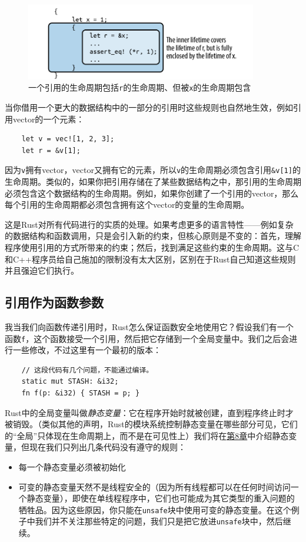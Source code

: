 \begin{figure}[htbp]
    \centering
    \includegraphics[width=0.9\textwidth]{../img/f5-6.png}
    \caption{一个引用的生命周期包括\texttt{r}的生命周期、但被\texttt{x}的生命周期包含}
    \label{f5-6}
\end{figure}

当你借用一个更大的数据结构中的一部分的引用时这些规则也自然地生效，例如引用vector的一个元素：
\begin{verbatim}
    let v = vec![1, 2, 3];
    let r = &v[1];
\end{verbatim}

因为\texttt{v}拥有vector，vector又拥有它的元素，所以\texttt{v}的生命周期必须包含引用\texttt{\&v[1]}的生命周期。类似的，如果你把引用存储在了某些数据结构之中，那引用的生命周期必须包含这个数据结构的生命周期。例如，如果你创建了一个引用的vector，那么每个引用的生命周期都必须包含拥有这个vector的变量的生命周期。

这是Rust对所有代码进行的实质的处理。如果考虑更多的语言特性——例如复杂的数据结构和函数调用，只是会引入新的约束，但核心原则是不变的：首先，理解程序使用引用的方式所带来的约束；然后，找到满足这些约束的生命周期。这与C和C++程序员给自己施加的限制没有太大区别，区别在于Rust自己知道这些规则并且强迫它们执行。

\subsection{引用作为函数参数}\label{RefAsArg}

我当我们向函数传递引用时，Rust怎么保证函数安全地使用它？假设我们有一个函数\texttt{f}，这个函数接受一个引用，然后把它存储到一个全局变量中。我们之后会进行一些修改，不过这里有一个最初的版本：
\begin{verbatim}
    // 这段代码有几个问题，不能通过编译。
    static mut STASH: &i32;
    fn f(p: &i32) { STASH = p; }
\end{verbatim}

Rust中的全局变量叫做\emph{静态变量}：它在程序开始时就被创建，直到程序终止时才被销毁。（类似其他的声明，Rust的模块系统控制静态变量在哪些部分可见，它们的“全局”只体现在生命周期上，而不是在可见性上）我们将在\hyperref[ch08]{第8章}中介绍静态变量，但现在我们只列出几条代码没有遵守的规则：
\begin{itemize}
    \item 每一个静态变量必须被初始化
    \item 可变的静态变量天然不是线程安全的（因为所有线程都可以在任何时间访问一个静态变量），即使在单线程程序中，它们也可能成为其它类型的重入问题的牺牲品。因为这些原因，你只能在\texttt{unsafe}块中使用可变的静态变量。在这个例子中我们并不关注那些特定的问题，我们只是把它放进\texttt{unsafe}块中，然后继续。
\end{itemize}

